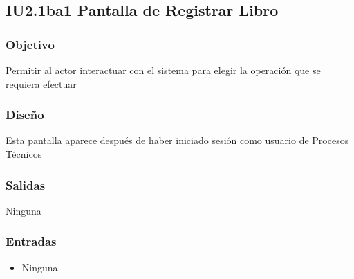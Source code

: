 \newpage
\subsection{IU2.1ba1 Pantalla de Registrar Libro}

\subsubsection{Objetivo}
	Permitir al actor interactuar con el sistema para elegir la operación que se requiera efectuar

\subsubsection{Diseño}
	Esta pantalla aparece después de haber iniciado sesión como usuario de Procesos Técnicos 


\subsubsection{Salidas}
	\begin{Citemize}
	        \item Ninguna
	\end{Citemize}
	
\subsubsection{Entradas}
		\begin{itemize}
        	\item Ninguna
        \end{itemize}  